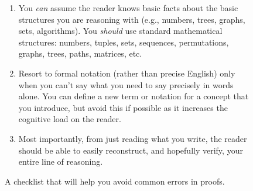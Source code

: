 \begin{figure}
\begin{myframed}
\begin{enumerate}
\item
  You \emph{can} assume the reader knows basic facts about the basic structures
  you are reasoning with (e.g., numbers, trees, graphs, sets, algorithms).
  You \emph{should} use standard mathematical structures:
  numbers, tuples, sets, sequences, permutations, graphs, trees, paths, matrices, etc.

\item
  Resort to formal notation (rather than precise English) 
  only when you can't say what you need to say precisely in words alone.
  You can define a new term or notation for a concept that you introduce,
  but avoid this if possible as it increases the cognitive load on the reader.

\item Most importantly,
  from just reading what you write, the reader should be able to easily reconstruct, and hopefully verify,
  your entire line of reasoning.  

\end{enumerate}
\end{myframed}
\caption{A checklist that will help you avoid common errors in proofs.}\label{proofs: fig: checklist}
\end{figure}

